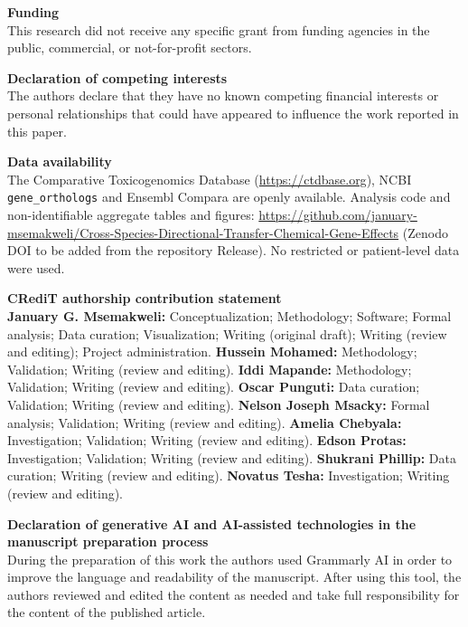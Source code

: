 \documentclass[11pt]{article}
\begin{document}
\vspace{6pt}
\textbf{\large Funding}\\[2pt]
This research did not receive any specific grant from funding agencies in the
public, commercial, or not-for-profit sectors.

\vspace{6pt}
\textbf{\large Declaration of competing interests}\\[2pt]
The authors declare that they have no known competing financial interests or
personal relationships that could have appeared to influence the work reported
in this paper.

\vspace{6pt}
\textbf{\large Data availability}\\[2pt]
The Comparative Toxicogenomics Database (\url{https://ctdbase.org}), NCBI
\texttt{gene\_orthologs} and Ensembl Compara are openly available. Analysis code
and non-identifiable aggregate tables and figures:
\url{https://github.com/january-msemakweli/Cross-Species-Directional-Transfer-Chemical-Gene-Effects}
(Zenodo DOI to be added from the repository Release).
No restricted or patient-level data were used.

\vspace{6pt}
\textbf{\large CRediT authorship contribution statement}\\[2pt]
\textbf{January G. Msemakweli:} Conceptualization; Methodology; Software; Formal
analysis; Data curation; Visualization; Writing (original draft); Writing
(review and editing); Project administration. \textbf{Hussein Mohamed:}
Methodology; Validation; Writing (review and editing). \textbf{Iddi Mapande:}
Methodology; Validation; Writing (review and editing). \textbf{Oscar Punguti:}
Data curation; Validation; Writing (review and editing). \textbf{Nelson Joseph
Msacky:} Formal analysis; Validation; Writing (review and editing).
\textbf{Amelia Chebyala:} Investigation; Validation; Writing (review and
editing). \textbf{Edson Protas:} Investigation; Validation; Writing (review and
editing). \textbf{Shukrani Phillip:} Data curation; Writing (review and
editing). \textbf{Novatus Tesha:} Investigation; Writing (review and editing).

\vspace{6pt}
\textbf{\large Declaration of generative AI and AI-assisted technologies in the
manuscript preparation process}\\[2pt]
During the preparation of this work the authors used Grammarly AI in order to
improve the language and readability of the manuscript. After using this tool,
the authors reviewed and edited the content as needed and take full
responsibility for the content of the published article.
\end{document}
